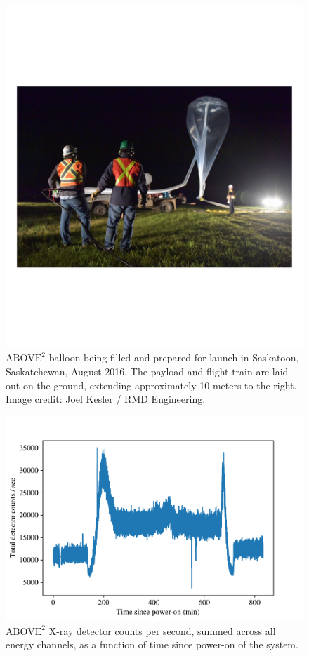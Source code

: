 \begin{figure}[p]
    \centering
    \includegraphics[width=1.0\textwidth]{figures/chapter_5/abv2_launch/abv2_launch}
    \caption{$\text{ABOVE}^2$ balloon being filled and prepared for launch in Saskatoon, Saskatchewan, August 2016. The payload and flight train are laid out on the ground, extending approximately 10 meters to the right. Image credit: Joel Kesler / RMD Engineering.}
    \label{abv2_launch}
\end{figure}

\begin{figure}[p]
    \centering
    \includegraphics[width=1.0\textwidth]{figures/chapter_5/abv2_counts/abv2_counts2.pdf}
    \caption{$\text{ABOVE}^2$ X-ray detector counts per second, summed across all energy channels, as a function of time since power-on of the system.}
    \label{abv2_counts}
\end{figure}

